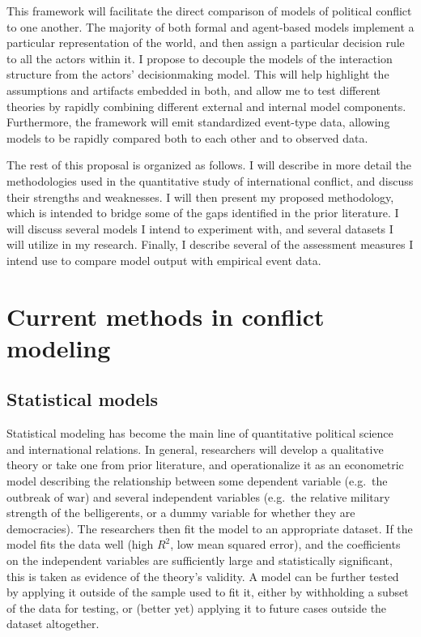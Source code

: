 This framework will facilitate the direct comparison of models of political conflict to one another. The majority of both formal and agent-based models implement a particular representation of the world, and then assign a particular decision rule to all the actors within it. I propose to decouple the models of the interaction structure from the actors' decisionmaking model. This will help highlight the assumptions and artifacts embedded in both, and allow me to test different theories by rapidly combining different external and internal model components. Furthermore, the framework will emit standardized event-type data, allowing models to be rapidly compared both to each other and to observed data.

The rest of this proposal is organized as follows. I will describe in more detail the methodologies used in the quantitative study of international conflict, and discuss their strengths and weaknesses. I will then present my proposed methodology, which is intended to bridge some of the gaps identified in the prior literature. I will discuss several models I intend to experiment with, and several datasets I will utilize in my research. Finally, I describe several of the assessment measures I intend use to compare model output with empirical event data.

\section{Current methods in conflict modeling}\label{current-methods-in-conflict-modeling}

\subsection{Statistical models}\label{statistical-models}

Statistical modeling has become the main line of quantitative political science and international relations. In general, researchers will develop a qualitative theory or take one from prior literature, and operationalize it as an econometric model describing the relationship between some dependent variable (e.g.~the outbreak of war) and several independent variables (e.g.~the relative military strength of the belligerents, or a dummy variable for whether they are democracies). The researchers then fit the model to an appropriate dataset. If the model fits the data well (high $R^2$, low mean squared error), and the coefficients on the independent variables are sufficiently large and statistically significant, this is taken as evidence of the theory's validity. A model can be further tested by applying it outside of the sample used to fit it, either by withholding a subset of the data for testing, or (better yet) applying it to future cases outside the dataset altogether.

